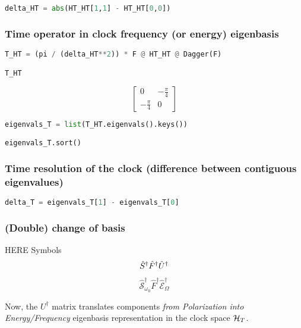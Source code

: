 \begin{lstlisting}[language=Python]
delta_HT = abs(HT_HT[1,1] - HT_HT[0,0])
\end{lstlisting}

\subsubsection*{Time operator in clock frequency (or energy) eigenbasis}

\begin{lstlisting}[language=Python]
T_HT = (pi / (delta_HT**2)) * F @ HT_HT @ Dagger(F) 

T_HT
\end{lstlisting}
$$
  \left[\begin{matrix}0 & - \frac{\pi}{4}\\- \frac{\pi}{4} & 0\end{matrix}\right]
$$
\begin{lstlisting}[language=Python]
eigenvals_T = list(T_HT.eigenvals().keys())

eigenvals_T.sort()
\end{lstlisting}

\subsubsection*{Time resolution of the clock (difference between contiguous eigenvalues)}

\begin{lstlisting}[language=Python]
delta_T = eigenvals_T[1] - eigenvals_T[0]
\end{lstlisting}

\subsubsection*{(Double) change of basis}

HERE Symbols
\begin{equation}
\hat{S}^{\dagger}\hat{F}^{\dagger}\hat{U}^{\dagger}
\end{equation}

\begin{equation}
  \hat{\mathcal{S}}_{\omega_0}^{\dagger} \hat{F}^{\dagger} \hat{\mathcal{E}}_{\Omega}^{\dagger}
\end{equation}

Now, the $U^{\dagger}$ matrix translates components \emph{from Polarization into Energy/Frequency} eigenbasis representation
in the clock space $\mathcal{H}_T$.

